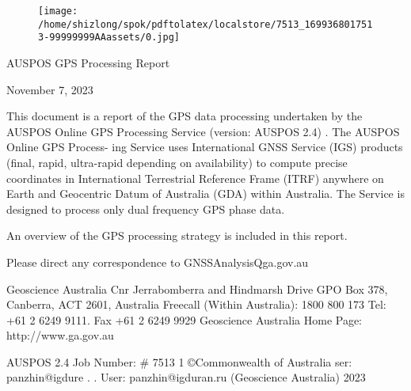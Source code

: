 \documentclass[a4paper,12pt]{article}
\begin{document}
\begin{figure}[h]

\texttt{[image: /home/shizlong/spok/pdftolatex/localstore/7513\_1699368017513-99999999AAassets/0.jpg]}

\centering

\end{figure}

    AUSPOS GPS Processing Report 

\vspace{10pt}

    November 7, 2023 

\vspace{10pt}

    This document is a report of the GPS data processing undertaken by the AUSPOS Online  GPS Processing Service (version: AUSPOS 2.4) . The AUSPOS Online GPS Process-  ing Service uses International GNSS Service (IGS) products (final, rapid, ultra-rapid  depending on availability) to compute precise coordinates in International Terrestrial  Reference Frame (ITRF) anywhere on Earth and Geocentric Datum of Australia (GDA)  within Australia. The Service is designed to process only dual frequency GPS phase data. 

\vspace{10pt}

    An overview of the GPS processing strategy is included in this report. 

\vspace{10pt}

    Please direct any correspondence to GNSSAnalysisQga.gov.au 

\vspace{10pt}

    Geoscience Australia   Cnr Jerrabomberra and Hindmarsh Drive  GPO Box 378, Canberra, ACT 2601, Australia  Freecall (Within Australia): 1800 800 173   Tel: +61 2 6249 9111. Fax +61 2 6249 9929  Geoscience Australia   Home Page: http://www.ga.gov.au 

\vspace{10pt}

         AUSPOS 2.4 Job Number: \# 7513 1 ©Commonwealth of Australia    ser: panzhin@igdure . .  User: panzhin@igduran.ru (Geoscience Australia) 2023 

\vspace{10pt}

\par

\vspace{10pt}
\end{document}
